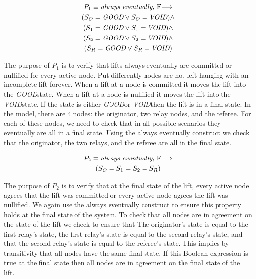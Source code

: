 \documentclass[runningheads]{llncs}
\newcommand{\originatorstate}{S_O}
\newcommand{\relayastate}{S_1}
\newcommand{\relaybstate}{S_2}
\newcommand{\refstate}{S_R}
\newcommand{\void}{\emph{VOID}}
\newcommand{\good}{\emph{GOOD}}
\newcommand{\always}{\emph{always}}
\newcommand{\eventually}{\emph{eventually}}
\newcommand{\fair}{$F$}
\begin{document}
\begin{definition}[Property 1]
\begin{multline*}
    P_1 \equiv \always\ \eventually,\ \fair \longrightarrow \\
    (\originatorstate = \good \vee \originatorstate = \void) \wedge \\
     (\relayastate = \good \vee \relayastate = \void) \wedge \\
     (\relaybstate = \good \vee \relaybstate = \void) \wedge \\
     (\refstate = \good \vee \refstate = \void) \\
\end{multline*}
\end{definition}
The purpose of $P_1$ is to verify that lifts always eventually are committed or nullified for every active node. Put differently nodes are not left hanging with an incomplete lift forever. 
When a lift at a node is committed it moves the lift into the \good state. When a lift at a node is nullified it moves the lift into the \void state. If the state is either \good or \void then the lift is in a final state. In the model, there are 4 nodes: the originator, two relay nodes, and the referee. For each of these nodes, we need to check that in all possible scenarios they eventually are all in a final state. Using the always eventually construct we check that the originator, the two relays, and the referee are all in the final state. 

\begin{definition}[Property 2]
    
\begin{multline*}
P_2 \equiv \always\ \eventually,\ \fair \longrightarrow \\
    (\originatorstate = \relayastate = \relaybstate = \refstate) \\
\end{multline*}
\end{definition}
The purpose of $P_2$ is to verify that at the final state of the lift, every active node agrees that the lift was committed or every active node agrees the lift was nullified. We again use the always eventually construct to ensure this property holds at the final state of the system. To check that all nodes are in agreement on the state of the lift we check to ensure that The originator's state is equal to the first relay's state, the first relay's state is equal to the second relay's state, and that the second relay's state is equal to the referee's state. This implies by transitivity that all nodes have the same final state. If this Boolean expression is true at the final state then all nodes are in agreement on the final state of the lift.
\end{document}
